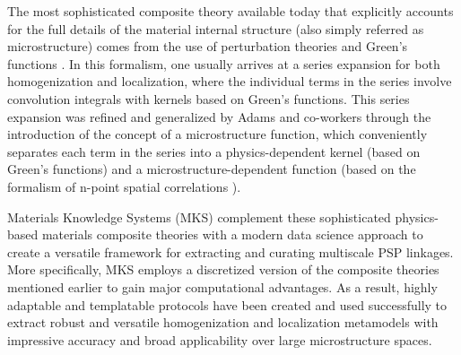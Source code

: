 \documentclass{bmcart}
\begin{document}
The most sophisticated composite theory available today that explicitly accounts for the full details of the material internal structure (also simply referred as microstructure) comes from the use of perturbation theories and Green's functions \cite{brown1955solid, hill1963elastic, kroner1986statistical, kroner1977bounds, kroner1972statistical, etingof1993representations, adams1998mesostructure, fullwood2008strong, torquato2013random, li2006quantitative, milhans2011prediction, adams2013microstructure, garmestani2001statistical}. In this formalism, one usually arrives at a series expansion for both homogenization and localization, where the individual terms in the series involve convolution integrals with kernels based  on  Green's functions. This series expansion was refined and generalized by Adams and co-workers \cite{adams2005finite, adams2013microstructure, binci2008new} through the introduction of the concept of a microstructure function, which conveniently separates each term in the series into a physics-dependent kernel (based on Green's functions) and a microstructure-dependent function (based on the formalism of n-point spatial correlations \cite{etingof1993representations, adams1998mesostructure, fullwood2008strong, torquato2013random, li2006quantitative, milhans2011prediction}).

Materials Knowledge Systems (MKS) \cite{landi2010multi,
  kalidindi2010novel, yabansu2014calibrated, al2012multi,
  kalidindi2011microstructure, gupta2015structure, cceccen2014data}
complement these sophisticated physics-based materials composite
theories with a modern data science approach to create a versatile
framework for extracting and curating multiscale PSP linkages. More
specifically, MKS employs a discretized version of the composite
theories mentioned earlier to gain major computational advantages. As
a result, highly adaptable and templatable protocols have been created
and used successfully to extract robust and versatile homogenization
and localization metamodels with impressive accuracy and broad
applicability over large microstructure spaces.
\end{document}
